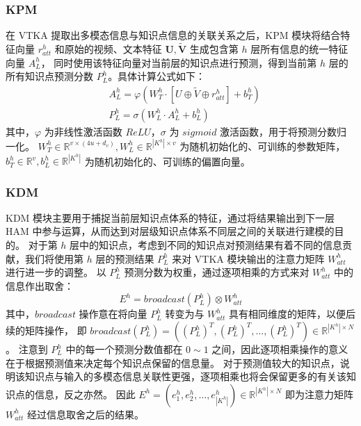     \subsubsection{KPM}
    在 VTKA 提取出多模态信息与知识点信息的关联关系之后，KPM 模块将结合特征向量 $r_{att}^h$ 和原始的视频、文本特征 $\boldsymbol{U}, \boldsymbol{\tilde{V}}$ 生成包含第 $h$ 层所有信息的统一特征向量 $A_L^h$，
    同时使用该特征向量对当前层的知识点进行预测，得到当前第 $h$ 层的所有知识点预测分数 $P_L^h$。具体计算公式如下：
    \begin{equation}
        \begin{aligned}
        &A_L^h = \varphi\left(W_T^h \cdot \left[U \oplus \tilde{V} \oplus r_{att}^h\right] + b_T^h\right) \\
        &P_L^h = \sigma\left(W_L^h \cdot A_L^h + b_L^h\right)
        \end{aligned}
    \end{equation}
    其中，$\varphi$ 为非线性激活函数 $ReLU$，$\sigma$ 为 $sigmoid$ 激活函数，用于将预测分数归一化。
    $W_T^h \in \mathbb{R}^{v \times (4u + d_v)}, W_L^h \in \mathbb{R}^{{\left|K^h\right|} \times v}$ 为随机初始化的、可训练的参数矩阵，
    $b_T^h \in \mathbb{R}^{v}, b_L^h \in \mathbb{R}^{\left|K^h\right|}$ 为随机初始化的、可训练的偏置向量。

    \subsubsection{KDM}
    KDM 模块主要用于捕捉当前层知识点体系的特征，通过将结果输出到下一层 HAM 中参与运算，从而达到对层级知识点体系不同层之间的关联进行建模的目的。
    对于第 $h$ 层中的知识点，考虑到不同的知识点对预测结果有着不同的信息贡献，我们将使用第 $h$ 层的预测结果 $P_L^h$ 来对 VTKA 模块输出的注意力矩阵 $W_{att}^h$ 进行进一步的调整。
    以 $P_L^h$ 预测分数为权重，通过逐项相乘的方式来对 $W_{att}^h$ 中的信息作出取舍：
    \begin{equation}
        E^h = broadcast(P_L^h) \otimes W_{att}^h
    \end{equation}
    其中，$broadcast$ 操作意在将向量 $P_L^h$ 转变为与 $W_{att}^h$ 具有相同维度的矩阵，以便后续的矩阵操作，
    即 $broadcast(P_L^h) = \left((P_L^h)^T, (P_L^h)^T, \dots, (P_L^h)^T\right) \in \mathbb{R}^{\left|K^h\right| \times N}$。
    注意到 $P_L^h$ 中的每一个预测分数值都在 $0 \sim 1$ 之间，因此逐项相乘操作的意义在于根据预测值来决定每个知识点保留的信息量。
    对于预测值较大的知识点，说明该知识点与输入的多模态信息关联性更强，逐项相乘也将会保留更多的有关该知识点的信息，反之亦然。
    因此 $E^h = (e_1^h, e_2^h, \dots, e_{\left|K^h\right|}^h) \in \mathbb{R}^{\left|K^h\right| \times N}$ 即为注意力矩阵 $W_{att}^h$ 经过信息取舍之后的结果。

